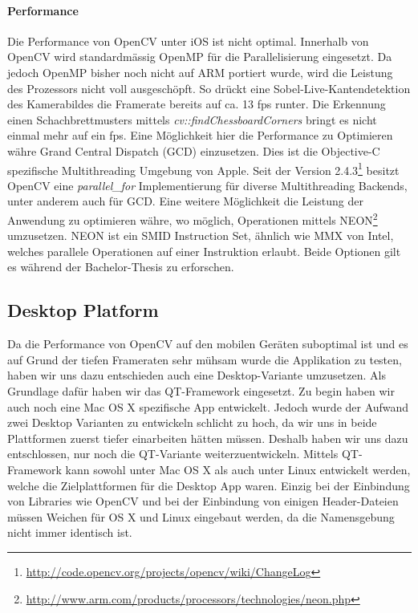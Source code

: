 \documentclass[main.tex]{subfiles}
\begin{document}
\paragraph{Performance} Die Performance von OpenCV unter iOS ist nicht optimal. Innerhalb von OpenCV wird standardmässig OpenMP für die Parallelisierung eingesetzt. Da jedoch OpenMP bisher noch nicht auf ARM portiert wurde, wird die Leistung des Prozessors nicht voll ausgeschöpft. So drückt eine Sobel-Live-Kantendetektion des Kamerabildes die Framerate bereits auf ca. 13 fps runter. Die Erkennung einen Schachbrettmusters mittels \textit{cv::findChessboardCorners} bringt es nicht einmal mehr auf ein fps. Eine Möglichkeit hier die Performance zu Optimieren währe Grand Central Dispatch (GCD) einzusetzen. Dies ist die Objective-C spezifische Multithreading Umgebung von Apple. Seit der Version 2.4.3\footnote{\url{http://code.opencv.org/projects/opencv/wiki/ChangeLog}} besitzt OpenCV eine \textit{parallel\_for} Implementierung für diverse Multithreading Backends, unter anderem auch für GCD. Eine weitere Möglichkeit die Leistung der Anwendung zu optimieren währe, wo möglich, Operationen mittels NEON\footnote{\url{http://www.arm.com/products/processors/technologies/neon.php}} umzusetzen. NEON ist ein SMID Instruction Set, ähnlich wie MMX von Intel, welches parallele Operationen auf einer Instruktion erlaubt. Beide Optionen gilt es während der Bachelor-Thesis zu erforschen.

\subsection{Desktop Platform}
Da die Performance von OpenCV auf den mobilen Geräten suboptimal ist und es auf Grund der tiefen Frameraten sehr mühsam wurde die Applikation zu testen, haben wir uns dazu entschieden auch eine Desktop-Variante umzusetzen. Als Grundlage dafür haben wir das QT-Framework eingesetzt. Zu begin haben wir auch noch eine Mac OS X spezifische App entwickelt. Jedoch wurde der Aufwand zwei Desktop Varianten zu entwickeln schlicht zu hoch, da wir uns in beide Plattformen zuerst tiefer einarbeiten hätten müssen. Deshalb haben wir uns dazu entschlossen, nur noch die QT-Variante weiterzuentwickeln. Mittels QT-Framework kann sowohl unter Mac OS X als auch unter Linux entwickelt werden, welche die Zielplattformen für die Desktop App waren. Einzig bei der Einbindung von Libraries wie OpenCV und bei der Einbindung von einigen Header-Dateien müssen Weichen für OS X und Linux eingebaut werden, da die Namensgebung nicht immer identisch ist. 
\end{document}
